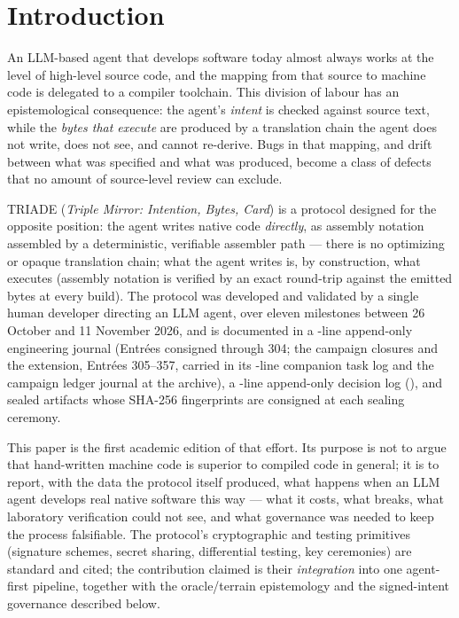 \documentclass[11pt,a4paper]{article}
\begin{document}
\section{Introduction}\label{sec:intro}

An LLM-based agent that develops software today almost always works at the
level of high-level source code, and the mapping from that source to
machine code is delegated to a compiler toolchain. This division of labour
has an epistemological consequence: the agent's \emph{intent} is checked
against source text, while the \emph{bytes that execute} are produced by a
translation chain the agent does not write, does not see, and cannot
re-derive. Bugs in that mapping, and drift between what was specified and
what was produced, become a class of defects that no amount of source-level
review can exclude.

TRIADE (\emph{Triple Mirror: Intention, Bytes, Card}) is a protocol
designed for the opposite position: the agent writes native code
\emph{directly}, as assembly notation assembled by a deterministic,
verifiable assembler path --- there is no optimizing or opaque translation
chain; what the agent writes is, by construction, what executes
(assembly notation is verified by an exact round-trip against the emitted
bytes at every build). The protocol was developed and validated by a
single human developer directing an LLM agent, over eleven milestones
between 26 October and 11 November 2026, and is documented in a
\nbLignesJournal-line append-only engineering journal (Entr\'ees
consigned through 304; the campaign closures and the extension,
Entr\'ees 305--357,
carried in its \nbLignesWorklog-line companion task log and the campaign
ledger journal at the archive), a \nbLignesDecisions-line append-only
decision log (\plageDecisions), and sealed artifacts whose
SHA-256 fingerprints are consigned at each sealing ceremony.

This paper is the first academic edition of that effort. Its purpose is
not to argue that hand-written machine code is superior to compiled code
in general; it is to report, with the data the protocol itself produced,
what happens when an LLM agent develops real native software this way ---
what it costs, what breaks, what laboratory verification could not see,
and what governance was needed to keep the process falsifiable. The
protocol's cryptographic and testing primitives (signature schemes,
secret sharing, differential testing, key ceremonies) are standard and
cited; the contribution claimed is their \emph{integration} into one
agent-first pipeline, together with the oracle/terrain epistemology and
the signed-intent governance described below.
\end{document}
